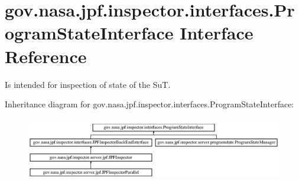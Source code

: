 \hypertarget{interfacegov_1_1nasa_1_1jpf_1_1inspector_1_1interfaces_1_1_program_state_interface}{}\section{gov.\+nasa.\+jpf.\+inspector.\+interfaces.\+Program\+State\+Interface Interface Reference}
\label{interfacegov_1_1nasa_1_1jpf_1_1inspector_1_1interfaces_1_1_program_state_interface}


Is intended for inspection of state of the SuT.  


Inheritance diagram for gov.\+nasa.\+jpf.\+inspector.\+interfaces.\+Program\+State\+Interface\+:\begin{figure}[H]
\begin{center}
\leavevmode
\includegraphics[height=2.835443cm]{interfacegov_1_1nasa_1_1jpf_1_1inspector_1_1interfaces_1_1_program_state_interface}
\end{center}
\end{figure}
